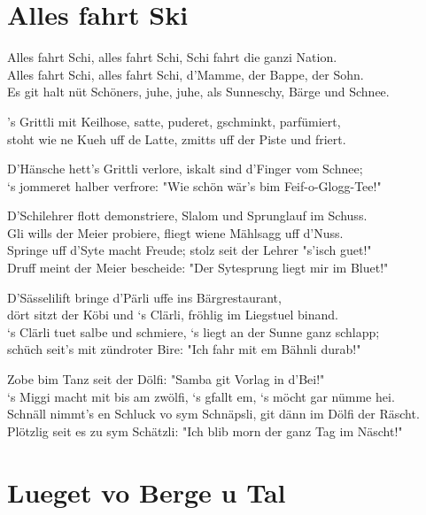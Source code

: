 \documentclass[
  letterpaper,
  twoside=false]{scrbook}
\begin{document}
\hypertarget{alles-fahrt-ski}{%
\chapter{Alles fahrt Ski}\label{alles-fahrt-ski}}

Alles fahrt Schi, alles fahrt Schi, Schi fahrt die ganzi Nation.\\
Alles fahrt Schi, alles fahrt Schi, d'Mamme, der Bappe, der Sohn.\\
Es git halt nüt Schöners, juhe, juhe, als Sunneschy, Bärge und Schnee.

's Grittli mit Keilhose, satte, puderet, gschminkt, parfümiert,\\
stoht wie ne Kueh uff de Latte, zmitts uff der Piste und friert.

D'Hänsche hett's Grittli verlore, iskalt sind d'Finger vom Schnee;\\
`s jommeret halber verfrore: "Wie schön wär's bim Feif-o-Glogg-Tee!"

D'Schilehrer flott demonstriere, Slalom und Sprunglauf im Schuss.\\
Gli wills der Meier probiere, fliegt wiene Mählsagg uff d'Nuss.\\
Springe uff d'Syte macht Freude; stolz seit der Lehrer "s'isch guet!"\\
Druff meint der Meier bescheide: "Der Sytesprung liegt mir im Bluet!"

D'Sässelilift bringe d'Pärli uffe ins Bärgrestaurant,\\
dört sitzt der Köbi und `s Clärli, fröhlig im Liegstuel binand.\\
`s Clärli tuet salbe und schmiere, `s liegt an der Sunne ganz schlapp;\\
schüch seit's mit zündroter Bire: "Ich fahr mit em Bähnli durab!"

Zobe bim Tanz seit der Dölfi: "Samba git Vorlag in d'Bei!"\\
`s Miggi macht mit bis am zwölfi, `s gfallt em, `s möcht gar nümme
hei.\\
Schnäll nimmt's en Schluck vo sym Schnäpsli, git dänn im Dölfi der
Räscht.\\
Plötzlig seit es zu sym Schätzli: "Ich blib morn der ganz Tag im
Näscht!"

\hypertarget{lueget-vo-berge-u-tal}{%
\chapter{Lueget vo Berge u Tal}\label{lueget-vo-berge-u-tal}}
\end{document}
